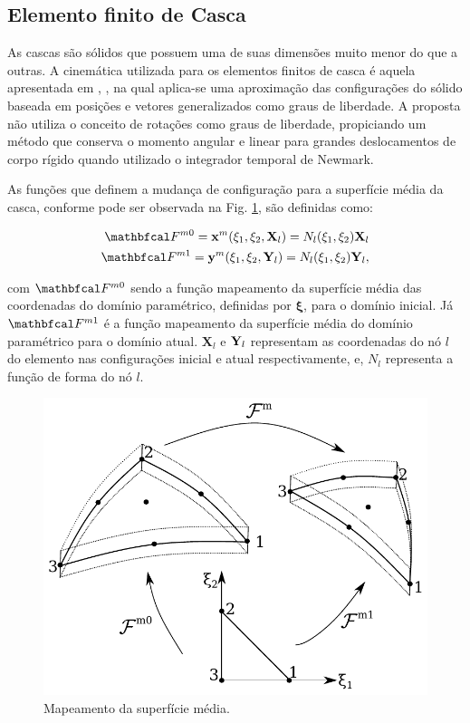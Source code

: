 \documentclass[tese_patricia]{subfiles}
\begin{document}
\subsection{Elemento finito de Casca}

As cascas são sólidos que possuem uma de suas dimensões muito menor do que a outras. A cinemática utilizada para os elementos finitos de casca é aquela apresentada em , , na qual aplica-se uma aproximação das configurações do sólido baseada em posições e vetores generalizados como graus de liberdade. A proposta não utiliza o conceito de rotações como graus de liberdade, propiciando um método que conserva o momento angular e linear para grandes deslocamentos de corpo rígido quando utilizado o integrador temporal de Newmark.

As funções que definem a mudança de configuração para a superfície média da casca, conforme pode ser observada na Fig. \ref{fig:casca1}, são definidas como:

\begin{align}
\deformation^{m0} = \lPosition^{m}(\xi_{1},\xi_{2},\mathbf{X}_{l}) = N_{l} (\xi_{1},\xi_{2}) \mathbf{X}_{l}\label{eq:Lposition}\\
\deformation^{m1} = \ePosition^{m}(\xi_{1},\xi_{2},\SolidPos_{l}) = N_{l} (\xi_{1},\xi_{2}) \SolidPos_{l}, \label{eq:Eposition}
\end{align}

\noindent com $\deformation^{m0}$ sendo a função mapeamento da superfície média das coordenadas do domínio paramétrico, definidas por $\bm{\xi}$, para o domínio inicial. Já $\deformation^{m1}$ é a função mapeamento da superfície média do domínio paramétrico para o domínio atual. $\mathbf{X}_{l}$ e $\mathbf{Y}_{l}$ representam as coordenadas do nó $l$ do elemento nas configurações inicial e atual respectivamente, e,  $N_{l}$ representa a função de forma do nó $l$.

\begin{figure}[htb!]
	\centering
	\includegraphics[scale=0.8,trim=0cm 0.0cm 0cm 0cm, clip=true]{Imagens/Cap3/midSurf.pdf}	
	\caption{Mapeamento da superfície média.}
	\label{fig:casca1}
\end{figure}
\end{document}
